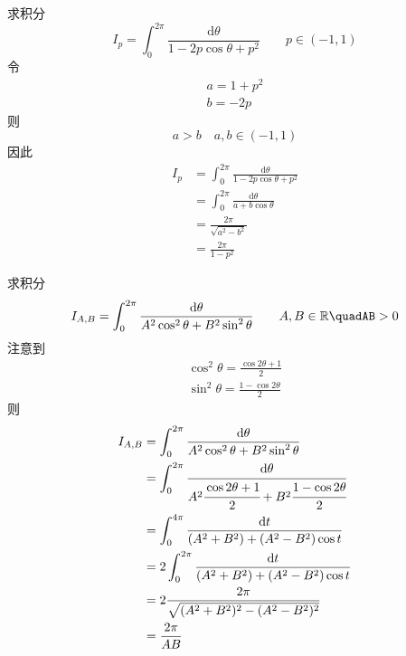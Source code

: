 \begin{homeworkProblem}
    求积分
    \[
    I_p = \int_0^{2\pi}\frac{\mathrm{d}\theta}{1-2p\cos\theta+p^2}\qquad p\in(-1,1)
    \]
\solution
令
\begin{gather*}
a=1+p^2\\
b=-2p
\end{gather*}
则\[a>b\quad a,b\in(-1,1)\]
因此
\[\begin{split}
I_p
&= \int_0^{2\pi}\frac{\mathrm{d}\theta}{1-2p\cos\theta+p^2}\\
&= \int_0^{2\pi}\frac{\mathrm{d}\theta}{a+b\cos\theta}\\
&=\frac{2\pi}{\sqrt{a^2-b^2}} \\
&=\frac{2\pi}{1-p^2}
\end{split} \]
\end{homeworkProblem}
\begin{homeworkProblem}
    求积分
    \[
    I_{A,B} = \int_0^{2\pi}\frac{\dtheta}{A^2\cos^2\theta + B^2\sin^2\theta}
    \qquad A,B\in\mathbb{R}\quadAB>0
    \]
\solution
注意到
\begin{gather*}
\cos^2\theta = \frac{\cos2\theta+1}{2}\\
\sin^2\theta = \frac{1-\cos2\theta}{2}
\end{gather*}
则
\[\begin{split}
I_{A,B} &= \int_0^{2\pi}\frac{\mathrm{d}\theta}{A^2\cos^2\theta + B^2\sin^2\theta}\\
&= \int_0^{2\pi}\cfrac{\mathrm{d}\theta}{A^2\cfrac{\cos2\theta+1}{2} + B^2\cfrac{1-\cos2\theta}{2}} \\
&= \int_0^{4\pi}\frac{\mathrm{d}t}{(A^2+B^2)+(A^2-B^2)\cos t}\\
&= 2\int_0^{2\pi}\frac{\mathrm{d}t}{(A^2+B^2)+(A^2-B^2)\cos t}\\
&=2\frac{2\pi}{\sqrt{(A^2+B^2)^2-(A^2-B^2)^2}}\\
&=\frac{2\pi}{AB}
\end{split}\]
\end{homeworkProblem}

